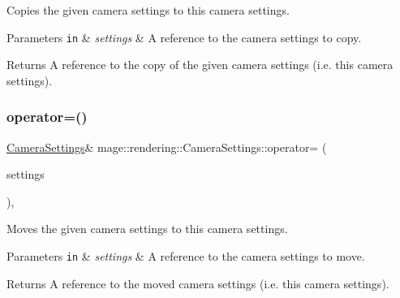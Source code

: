 Copies the given camera settings to this camera settings.


\begin{DoxyParams}[1]{Parameters}
\mbox{\tt in}  & {\em settings} & A reference to the camera settings to copy. \\
\hline
\end{DoxyParams}
\begin{DoxyReturn}{Returns}
A reference to the copy of the given camera settings (i.\+e. this camera settings). 
\end{DoxyReturn}
\hypertarget{classmage_1_1rendering_1_1_camera_settings_a28ae670d467adfc74ef8929f24b2e615}{}\label{classmage_1_1rendering_1_1_camera_settings_a28ae670d467adfc74ef8929f24b2e615} 
\subsubsection{\texorpdfstring{operator=()}{operator=()}\hspace{0.1cm}{\footnotesize\ttfamily [2/2]}}
{\footnotesize\ttfamily \hyperlink{classmage_1_1rendering_1_1_camera_settings}{Camera\+Settings}\& mage\+::rendering\+::\+Camera\+Settings\+::operator= (\begin{DoxyParamCaption}\item[{\hyperlink{classmage_1_1rendering_1_1_camera_settings}{Camera\+Settings} \&\&}]{settings }\end{DoxyParamCaption})\hspace{0.3cm}{\ttfamily [default]}, {\ttfamily [noexcept]}}

Moves the given camera settings to this camera settings.


\begin{DoxyParams}[1]{Parameters}
\mbox{\tt in}  & {\em settings} & A reference to the camera settings to move. \\
\hline
\end{DoxyParams}
\begin{DoxyReturn}{Returns}
A reference to the moved camera settings (i.\+e. this camera settings). 
\end{DoxyReturn}
\hypertarget{classmage_1_1rendering_1_1_camera_settings_a49c766f4880c798a90a9b8fe488a6711}{}\label{classmage_1_1rendering_1_1_camera_settings_a49c766f4880c798a90a9b8fe488a6711} 
